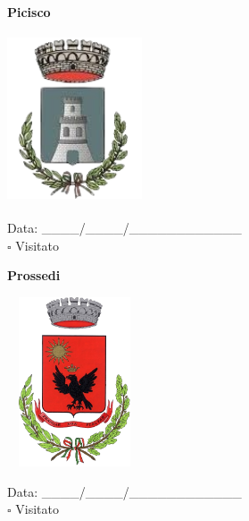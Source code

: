 \documentclass[a5paper,12pt]{article}
\begin{document}
\vspace{0.7cm}

\noindent
\begin{minipage}[t]{0.45\textwidth}
    \begin{center}
        \textbf{Picisco}
    \end{center}
    \vspace{-0.5cm} %
    \begin{center}
        \includegraphics[height= 5cm, width=4cm]{Lazio/Stemma Picisco.png}
    \end{center}
    \vspace{-0.4cm} %
    \begin{flushleft}
        Data: \_\_\_\_/\_\_\_\_/\_\_\_\_\_\_\_\_\_\_\_\_ \\
        $\square$ Visitato
    \end{flushleft}
\end{minipage}
\hfill
\noindent
\begin{minipage}[t]{0.45\textwidth}
    \begin{center}
        \textbf{Prossedi}
    \end{center}
    \vspace{-0.5cm} %
    \begin{center}
        \includegraphics[height= 5cm, width=4cm]{Lazio/Stemma Prossedi.png}
    \end{center}
    \vspace{-0.4cm} %
    \begin{flushleft}
        Data: \_\_\_\_/\_\_\_\_/\_\_\_\_\_\_\_\_\_\_\_\_ \\
        $\square$ Visitato
    \end{flushleft}
\end{minipage}
\end{document}
